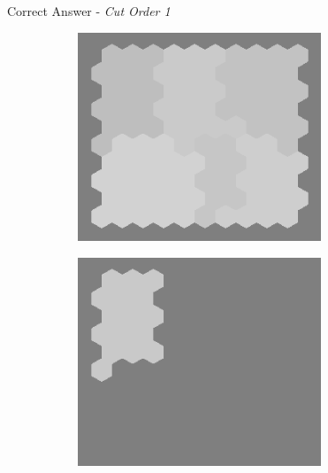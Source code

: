 \documentclass[10pt,xcolor=svgnames]{beamer} %
\begin{document}
\begin{frame}[standout]{Correct Answer - \textit{Cut Order 1}}
    \begin{figure}
        \centering
        \begin{subfigure}{0.4\textwidth}
        \centering
            \includegraphics[width=0.8\textwidth]{pictures/grid_init4.png}
        \end{subfigure}
        \hfill
        \begin{subfigure}{0.4\textwidth}
            \centering
            \includegraphics[width=0.8\textwidth]{pictures/seg_2_cut1.png}
        \end{subfigure}
    \end{figure}
\end{frame}
\end{document}
